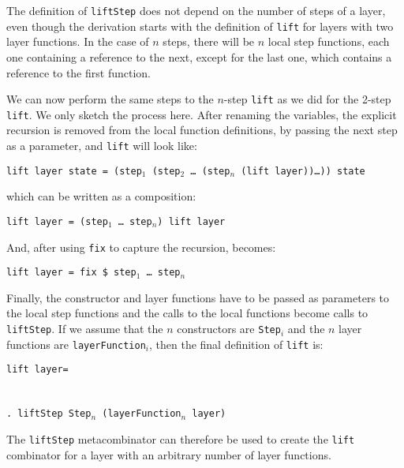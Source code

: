 \par {}The definition of \texttt{liftStep} does not depend on
        the number of steps of a layer, even though the derivation starts with the
        definition of \texttt{lift} for layers with two layer functions. In the case of
        $n$ steps, there will be $n$ local step functions, each one containing a
        reference to the next, except for the last one, which contains a reference to
        the first function. 
\par We can now perform the same steps to the $n$-step \texttt{lift} as we
        did for the 2-step \texttt{lift}. We only sketch the process here. After
        renaming the variables, the explicit recursion is removed from the local
        function definitions, by passing the next step as a parameter, and
        \texttt{lift} will look like:\begin{tabbing}
{\tt l}\={\tt ift layer state = (step$_1$ (step$_2$ \dots ~(step$_n$ (lift layer))\dots)) state}\\
\end{tabbing}
\par which can be written as a composition:\begin{tabbing}
{\tt l}\={\tt ift layer = (step$_1$ \dots ~step$_n$) lift layer}\\
\end{tabbing}
\par And, after using \texttt{fix} to capture the recursion, becomes:\begin{tabbing}
{\tt l}\={\tt ift layer = fix \$ step$_1$ \dots ~step$_n$}\\
\end{tabbing}
\par Finally, the constructor and layer functions have to be passed as
        parameters to the local step functions and the calls to the local functions
        become calls to \texttt{liftStep}. If we assume that the $n$ constructors are
        \texttt{Step$_i$} and the $n$ layer functions are \texttt{layerFunction$_i$},
        then the final definition of \texttt{lift} is:\begin{tabbing}
{\tt li}\={\tt ft l}\={\tt ayer= }\\
\\
\>\\ 
\>\>\verb|. lift|{\tt Step Step$_n$ (layerFunction$_n$ layer)}
\end{tabbing}
\par The \texttt{liftStep} metacombinator can therefore be used to create
        the \texttt{lift} combinator for a layer with an arbitrary number of layer
        functions.
